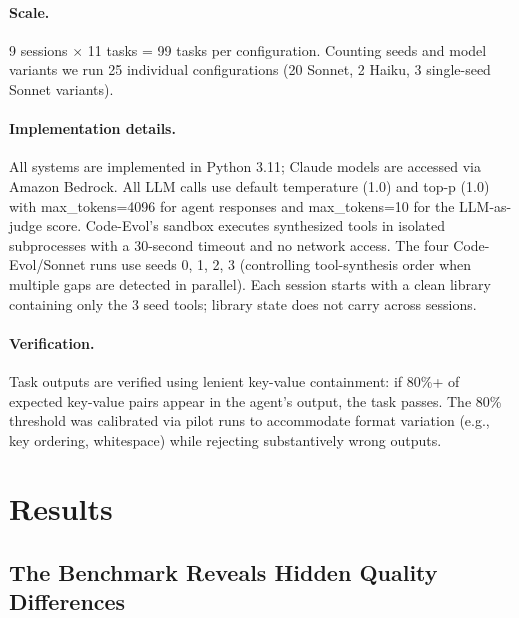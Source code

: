\documentclass[sigplan,nonacm,natbib=false]{acmart}
\begin{document}
\paragraph{Scale.} 9 sessions $\times$ 11 tasks = 99 tasks per configuration. Counting seeds and model variants we run 25 individual configurations (20 Sonnet, 2 Haiku, 3 single-seed Sonnet variants).

\paragraph{Implementation details.} All systems are implemented in Python 3.11; Claude models are accessed via Amazon Bedrock. All LLM calls use default temperature (1.0) and top-p (1.0) with max\_tokens=4096 for agent responses and max\_tokens=10 for the LLM-as-judge score. Code-Evol's sandbox executes synthesized tools in isolated subprocesses with a 30-second timeout and no network access. The four Code-Evol/Sonnet runs use seeds 0, 1, 2, 3 (controlling tool-synthesis order when multiple gaps are detected in parallel). Each session starts with a clean library containing only the 3 seed tools; library state does not carry across sessions.

\paragraph{Verification.} Task outputs are verified using lenient key-value containment: if 80\%+ of expected key-value pairs appear in the agent's output, the task passes. The 80\% threshold was calibrated via pilot runs to accommodate format variation (e.g., key ordering, whitespace) while rejecting substantively wrong outputs.

\section{Results}
\label{sec:results}

\subsection{The Benchmark Reveals Hidden Quality Differences}
\end{document}
